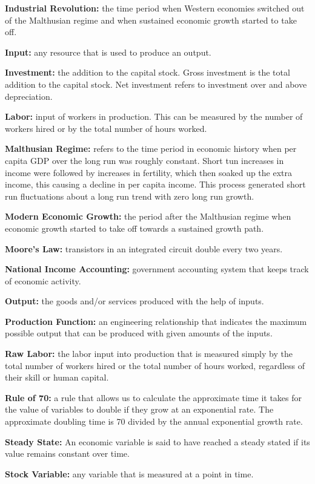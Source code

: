 \documentclass[
]{book}
\begin{document}
\textbf{Industrial Revolution:} the time period when Western economies switched out of the Malthusian regime and when sustained economic growth started to take off.

\textbf{Input:} any resource that is used to produce an output.

\textbf{Investment:} the addition to the capital stock. Gross investment is the total addition to the capital stock. Net investment refers to investment over and above depreciation.

\textbf{Labor:} input of workers in production. This can be measured by the number of workers hired or by the total number of hours worked.

\textbf{Malthusian Regime:} refers to the time period in economic history when per capita GDP over the long run was roughly constant. Short tun increases in income were followed by increases in fertility, which then soaked up the extra income, this causing a decline in per capita income. This process generated short run fluctuations about a long run trend with zero long run growth.

\textbf{Modern Economic Growth:} the period after the Malthusian regime when economic growth started to take off towards a sustained growth path.

\textbf{Moore's Law:} transistors in an integrated circuit double every two years.

\textbf{National Income Accounting:} government accounting system that keeps track of economic activity.

\textbf{Output:} the goods and/or services produced with the help of inputs.

\textbf{Production Function:} an engineering relationship that indicates the maximum possible output that can be produced with given amounts of the inputs.

\textbf{Raw Labor:} the labor input into production that is measured simply by the total number of workers hired or the total number of hours worked, regardless of their skill or human capital.

\textbf{Rule of 70:} a rule that allows us to calculate the approximate time it takes for the value of variables to double if they grow at an exponential rate. The approximate doubling time is 70 divided by the annual exponential growth rate.

\textbf{Steady State:} An economic variable is said to have reached a steady stated if its value remains constant over time.

\textbf{Stock Variable:} any variable that is measured at a point in time.
\end{document}
